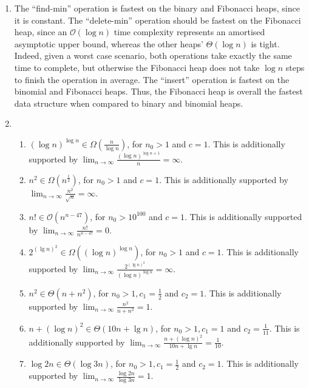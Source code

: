 \documentclass[12pt]{article}
\begin{document}
\begin{enumerate}
\begin{enumerate}
    \item The ``find-min'' operation is fastest on the binary and Fibonacci heaps, since it is constant. The ``delete-min'' operation should be fastest on the Fibonacci heap, since an $\mathcal{O}(\log n)$ time complexity represents an amortised asymptotic upper bound, whereas the other heaps' $\Theta(\log n)$ is tight. Indeed, given a worst case scenario, both operations take exactly the same time to complete, but otherwise the Fibonacci heap does not take $\log n$ steps to finish the operation in average. The ``insert'' operation is fastest on the binomial and Fibonacci heaps. Thus, the Fibonacci heap is overall the fastest data structure when compared to binary and binomial heaps.
    
    \item
    \begin{enumerate}
      \item $(\log n)^{\log n} \in \Omega(\frac{n}{\log n})$, for $n_{0} > 1$ and $c = 1$. This is additionally supported by $\lim_{n\to\infty} \frac{(\log n)^{\log n + 1}}{n} = \infty$.
      
      \item $n^{2} \in \Omega(n^{\frac{1}{2}})$, for $n_{0} > 1$ and $c = 1$. This is additionally supported by $\lim_{n\to\infty} \frac{n^{2}}{\sqrt{n}} = \infty$. 
      
      \item $n! \in \mathcal{O}(n^{n - 47})$, for $n_{0} > 10^{100}$ and $c = 1$. This is additionally supported by $\lim_{n\to\infty} \frac{n!}{n^{n - 47}} = 0$.
      
      \item $2^{{(\lg n)}^{2}} \in \Omega((\log n)^{\log n})$, for $n_{0} > 1$ and $c = 1$. This is additionally supported by $\lim_{n\to\infty} \frac{2^{{(\lg n)}^{2}}}{(\log n)^{\log n}} = \infty$.
      
      \item $n^{2} \in \Theta(n + n^{2})$, for $n_{0} > 1, c_{1} = \frac{1}{2}$ and $c_{2} = 1$. This is additionally supported by $\lim_{n\to\infty} \frac{n^{2}}{n + n^{2}} = 1$.
      
      \item $n + (\log n)^{2} \in \Theta(10n + \lg n)$, for $n_{0} > 1, c_{1} = 1$ and $c_{2} = \frac{1}{11}$. This is additionally supported by $\lim_{n\to\infty} \frac{n + (\log n)^{2}}{10n + \lg n} = \frac{1}{10}$.
      
      \item $\log 2n \in \Theta(\log 3n)$, for $n_{0} > 1, c_{1} = \frac{1}{2}$ and $c_{2} = 1$. This is additionally supported by $\lim_{n\to\infty} \frac{\log 2n}{\log 3n} = 1$.
      

\end{enumerate}
\end{enumerate}
\end{enumerate}
\end{document}
